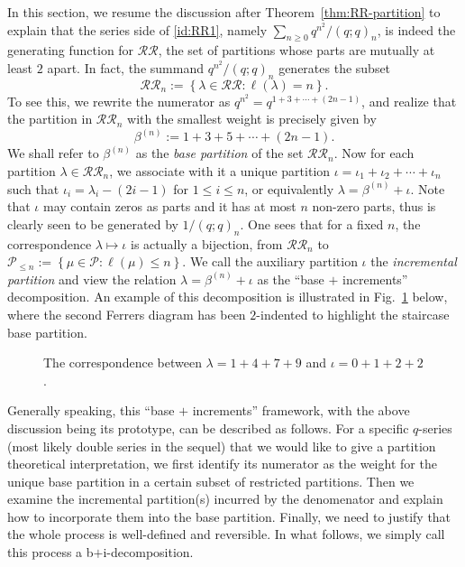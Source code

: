 \documentclass[11pt,reqno]{amsart}
\numberwithin{equation}{section}
\theoremstyle{plain}
\theoremstyle{definition}
\newcommand{\set}[1]{\left\{#1\right\}}
\def\la{\lambda}
\renewcommand{\P}{\mathcal{P}}
\def\RR{\mathcal{RR}}
\begin{document}
In this section, we resume the discussion after Theorem~\ref{thm:RR-partition} to explain that the series side of \eqref{id:RR1}, namely $\sum_{n\ge 0}q^{n^2}/(q;q)_n$, is indeed the generating function for $\RR$, the set of partitions whose parts are mutually at least $2$ apart. In fact, the summand $q^{n^2}/(q;q)_n$ generates the subset 
$$\RR_n:=\set{\la\in\RR: \ell(\la)=n}.$$
To see this, we rewrite the numerator as $q^{n^2}=q^{1+3+\cdots+(2n-1)}$, and realize that the partition in $\RR_n$ with the smallest weight is precisely given by
$$\beta^{(n)}:=1+3+5+\cdots+(2n-1).$$
We shall refer to $\beta^{(n)}$ as the {\it base partition} of the set $\RR_n$. Now for each partition $\la\in\RR_n$, we associate with it a unique partition $\iota=\iota_1+\iota_2+\cdots+\iota_n$ such that $\iota_i=\la_i-(2i-1)$ for $1\le i\le n$, or equivalently $\la=\beta^{(n)}+\iota$. Note that $\iota$ may contain zeros as parts and it has at most $n$ non-zero parts, thus is clearly seen to be generated by $1/(q;q)_n$. One sees that for a fixed $n$, the correspondence $\la\mapsto \iota$ is actually a bijection, from $\RR_n$ to $\P_{\le n}:=\set{\mu\in\P: \ell(\mu)\le n}$. We call the auxiliary partition $\iota$ the {\it incremental partition} and view the relation $\la=\beta^{(n)}+\iota$ as the ``base $+$ increments'' decomposition. An example of this decomposition is illustrated in Fig.~\ref{fig:decomp} below, where the second Ferrers diagram has been $2$-indented to highlight the staircase base partition.

\begin{figure}[ht]
\begin{ferrers}
\addtext{2}{-2.2}{$\la$}
\transformto{}
\putright
{}
\end{ferrers}
\caption{The correspondence between $\lambda=1+4+7+9$ and $\iota=0+1+2+2$.}
\label{fig:decomp}
\end{figure}

Generally speaking, this ``base $+$ increments'' framework, with the above discussion being its prototype, can be described as follows. For a specific $q$-series (most likely double series in the sequel) that we would like to give a partition theoretical interpretation, we first identify its numerator as the weight for the unique base partition in a certain subset of restricted partitions. Then we examine the incremental partition(s) incurred by the denomenator and explain how to incorporate them into the base partition. Finally, we need to justify that the whole process is well-defined and reversible. In what follows, we simply call this process a b$+$i-decomposition.
\end{document}
